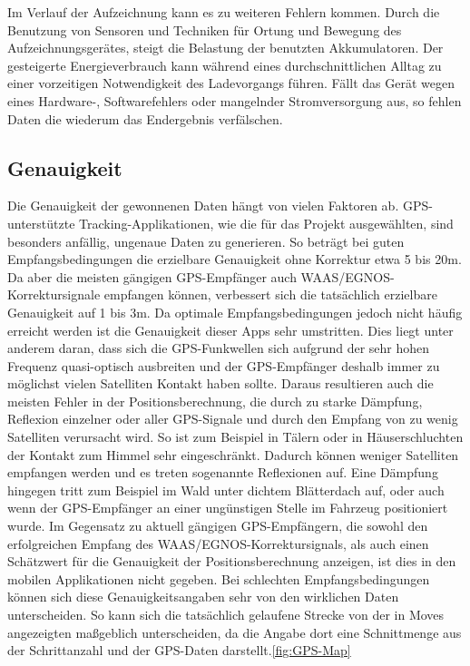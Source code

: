 Im Verlauf der Aufzeichnung kann es zu weiteren Fehlern kommen.
Durch die Benutzung von Sensoren und Techniken für Ortung und Bewegung des Aufzeichnungsgerätes, steigt die Belastung der benutzten Akkumulatoren.
Der gesteigerte Energieverbrauch kann während eines durchschnittlichen Alltag zu einer vorzeitigen Notwendigkeit des Ladevorgangs führen.
Fällt das Gerät wegen eines Hardware-, Softwarefehlers oder mangelnder Stromversorgung aus, so fehlen Daten die wiederum das Endergebnis verfälschen.

\subsection{Genauigkeit}
\label{ch:Relativierung:sec:SystematischeUndZufälligeFehler:subsec:Genauigkeit}

Die Genauigkeit der gewonnenen Daten hängt von vielen Faktoren ab. 
GPS-unterstützte Tracking-Applikationen, wie die für das Projekt ausgewählten, sind besonders  anfällig, ungenaue Daten zu generieren. 
So beträgt bei guten Empfangsbedingungen die erzielbare Genauigkeit ohne Korrektur etwa 5 bis 20m. 
Da aber die meisten gängigen GPS-Empfänger auch WAAS/EGNOS-Korrektursignale empfangen können, verbessert sich die tatsächlich erzielbare Genauigkeit auf 1 bis 3m.
Da optimale Empfangsbedingungen jedoch nicht häufig erreicht  werden ist die Genauigkeit dieser Apps sehr umstritten.
Dies liegt unter anderem daran, dass sich die GPS-Funkwellen sich aufgrund der sehr hohen Frequenz quasi-optisch ausbreiten und der GPS-Empfänger deshalb immer zu möglichst vielen Satelliten Kontakt haben sollte. 
Daraus resultieren auch die meisten Fehler in der Positionsberechnung, die durch zu starke Dämpfung, Reflexion einzelner oder aller GPS-Signale und durch den Empfang von zu wenig Satelliten verursacht wird.
So ist zum Beispiel in Tälern oder in Häuserschluchten der Kontakt zum Himmel sehr eingeschränkt. 
Dadurch können weniger Satelliten empfangen werden und es treten sogenannte Reflexionen auf. 
Eine Dämpfung hingegen tritt zum Beispiel im Wald unter dichtem Blätterdach auf, oder auch wenn der GPS-Empfänger an einer ungünstigen Stelle im Fahrzeug positioniert wurde.
Im Gegensatz zu aktuell gängigen GPS-Empfängern, die sowohl den erfolgreichen Empfang des WAAS/EGNOS-Korrektursignals, als auch einen Schätzwert für die Genauigkeit der Positionsberechnung anzeigen, ist dies in den mobilen Applikationen nicht gegeben. 
Bei schlechten Empfangsbedingungen können sich diese Genauigkeitsangaben sehr von den wirklichen Daten unterscheiden.  
So kann sich die tatsächlich gelaufene Strecke von der in Moves angezeigten maßgeblich unterscheiden, da die Angabe dort eine Schnittmenge aus der Schrittanzahl und der GPS-Daten darstellt.\ref{fig:GPS-Map}


